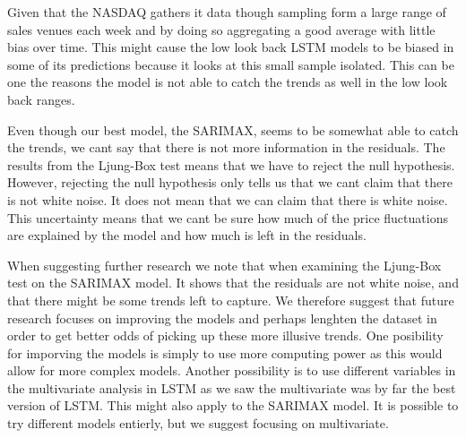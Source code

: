 Given that the NASDAQ gathers it data though sampling form a large range of sales venues each week and by doing so aggregating a good average with little bias over time. This might cause the low look back LSTM models to be biased in some of its predictions because it looks at this small sample isolated. This can be one the reasons the model is not able to catch the trends as well in the low look back ranges. 

Even though our best model, the SARIMAX, seems to be somewhat able to catch the trends, we cant say that there is not more information in the residuals. The results from the Ljung-Box test means that we have to reject the null hypothesis. However, rejecting the null hypothesis only tells us that we cant claim that there is not white noise. It does not mean that we can claim that there is white noise. This uncertainty means that we cant be sure how much of the price fluctuations are explained by the model and how much is left in the residuals. 

When suggesting further research we note that when
examining the Ljung-Box test on the SARIMAX model. It shows that the residuals are not white noise, and that there might be some trends left to capture. We therefore suggest that future research focuses on improving the models and perhaps lenghten the dataset in order to get better odds of picking up these more illusive trends. One posibility for imporving the models is simply to use more computing power as this would allow for more complex models. Another possibility is to use different variables in the multivariate analysis in LSTM as we saw the multivariate was by far the best version of LSTM. This might also apply to the SARIMAX model. It is possible to try different models entierly, but we suggest focusing on multivariate.


